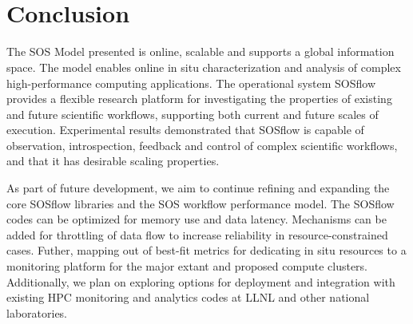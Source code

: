 

%
\\
\\
%
%

\section{Conclusion}
%
The SOS Model presented is online, scalable and supports a global information space. 
%
The model enables online in situ characterization and analysis of complex high-performance computing applications. 
%
The operational system SOSflow provides a flexible research platform for investigating the properties of existing and future scientific workflows, supporting both current and future scales of execution.
%
Experimental results demonstrated that SOSflow is capable of
observation, introspection, feedback and control of complex scientific
workflows, and that it has desirable scaling properties.
%

As part of future development, we aim to continue refining and expanding the core SOSflow libraries and the SOS workflow performance model.
%
The SOSflow codes can be optimized for memory use
and data latency. 
%
Mechanisms can be added for throttling of data flow to
increase reliability in resource-constrained cases. 
%
Futher, mapping out of best-fit metrics for dedicating in situ resources to a monitoring platform for the major extant and proposed compute clusters.
%
Additionally, we plan on exploring options for deployment and integration with
existing HPC monitoring and analytics codes at LLNL and other
national laboratories.


